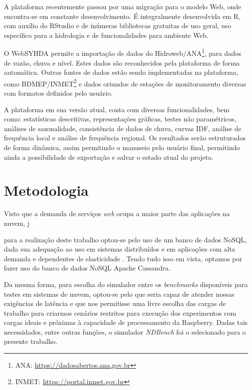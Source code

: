 \documentclass[12pt,english,brazil]{article}
\begin{document}
A plataforma recentemente passou por uma migração para o modelo Web, onde encontra-se em constante desenvolvimento. É integralmente desenvolvida em R, com auxílio do RStudio e de inúmeras bibliotecas gratuitas de uso geral, uso específico para a hidrologia e de funcionalidades para ambiente Web. %

O WebSYHDA permite a importação de dados do Hidroweb/ANA\footnote{ANA: \url{https://dadosabertos.ana.gov.br}}, para dados de vazão, chuva e nível. Estes dados são reconhecidos pela plataforma de forma automática. Outras fontes de dados estão sendo implementadas na plataforma, como BDMEP/INMET\footnote{INMET: \url{https://portal.inmet.gov.br}} e dados oriundos de estações de monitoramento diversas com formatos definidos pelo usuário.

A plataforma em sua versão atual, conta com diversas funcionalidades, bem como: estatísticas descritivas, representações gráficas, testes não paramétricos, análises de sazonalidade, consistência de dados de chuva, curvas IDF, análise de frequência local e análise de frequência regional. Os resultados serão estruturados de forma dinâmica, assim permitindo o manuseio pelo usuário final, permitindo ainda a possibilidade de exportação e salvar o estado atual do projeto. 

\section{Metodologia} \label{sec:metodologia}

Visto que a demanda de serviços \textit{web} ocupa a maior parte das aplicações na nuvem, j

para a realização deste trabalho optou-se pelo uso de um banco de dados NoSQL, dada sua adequação ao uso em sistemas distribuídos e em aplicações com alta demanda e dependentes de elasticidade \cite{cattell2011scalable}. Tendo tudo isso em vista, optamos por fazer uso do banco de dados NoSQL Apache Cassandra.

Da mesma forma, para escolha do simulador entre os \textit{benchmarks} disponíveis para testes em sistemas de nuvem, optou-se pelo que seria capaz de atender nossas exigências de latência e que nos permitisse uma livre escolha das cargas de trabalho para criarmos cenários restritos para execução dos experimentos com cargas ideais e próximas à capacidade de processamento da Raspberry. Dadas tais necessidades, entre outras funções, o simulador \textit{NDBench} foi o selecionado para o presente trabalho. 
\end{document}
